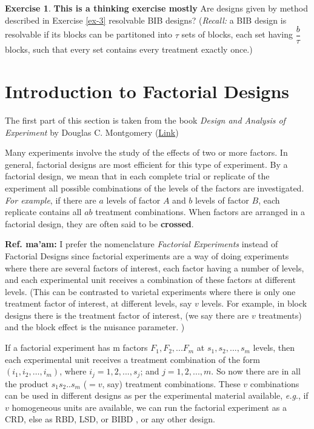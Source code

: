 \documentclass[12pt]{article}
\theoremstyle{definition}
\newtheorem{ex}{Exercise}
\newenvironment{note}{
\begin{tcolorbox}[colback=blue!5!white,colframe=blue!75!black,title=Note, parbox = false] }{\end{tcolorbox} }
\newenvironment{exercise}{
\begin{tcolorbox}[colback=red!5!white,colframe=red!75!black, parbox = false]\begin{ex} }{\end{ex}\end{tcolorbox} }
\begin{document}
\begin{exercise}
	\textbf{This is a thinking exercise mostly}
	Are designs given by method described in Exercise \ref{ex-3} resolvable BIB designs? (\textit{Recall:} a BIB design is resolvable if its blocks can be partitoned into $\tau$ sets of blocks, each set having $\dfrac{b}{\tau}$ blocks, such that every set contains every treatment exactly once.)
\end{exercise}

\newpage 

\section{Introduction to Factorial Designs}

The first part of this section is taken from the book \textit{Design and Analysis of Experiment} by Douglas C. Montgomery (\href{https://drive.google.com/open?id=1ZmF_RCztbGjLKawqP9l1Yo7ZsrOoI9ev}{Link})

Many experiments involve the study of the effects of two or more factors. In general, factorial designs are most efficient for this type of experiment. By a factorial design, we mean that in each complete trial or replicate of the experiment all possible combinations of the levels of the factors are investigated. \textit{For example}, if there are $a$ levels of factor $A$ and $b$ levels of factor $B$, each replicate contains all $ab$ treatment combinations. When factors are arranged in a factorial design, they are often said to be \textbf{crossed}. 

\begin{note}
\textbf{Ref. ma'am:} I prefer the nomenclature \textit{Factorial Experiments} instead of Factorial Designs since factorial experiments are a way of doing experiments where there are several factors of interest, each factor having a number of levels,  and each experimental unit receives a combination  of these factors at different levels. (This can be contrasted to  varietal experiments where there is only one treatment factor of interest, at different levels, say $v$ levels. For example, in block designs there is the treatment factor of interest, (we say there are $v$ treatments) and the block effect is the nuisance parameter. ) \par

If a factorial experiment has m factors $F_1, F_2, ...F_m$ at $s_1, s_2, ..., s_m$ levels, then each experimental unit receives a treatment combination of the form $(i_1,i_2, \ldots ,i_m)$, where  $i_j = 1, 2, ...,s_j$; and $j=1, 2, ..., m$. So now there are in all the product $s_1s_2..s_m$ ($=v$, say) treatment combinations. These $v$ combinations can be used in different designs as per the experimental material available, \textit{e.g}., if $v$ homogeneous units are available, we can run the factorial experiment  as a CRD,  else as  RBD, LSD, or BIBD , or any other design. 

\end{note}
\end{document}
